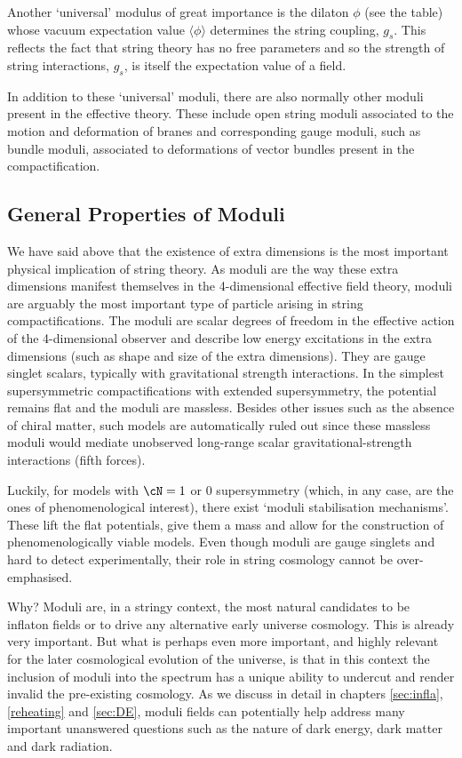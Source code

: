 Another `universal' modulus of great importance is the dilaton $\phi$ (see the table) whose vacuum expectation value $\langle \phi \rangle $ determines the  string coupling, $g_s$. This reflects the fact that string theory has no free parameters and so the strength of string interactions, $g_s$, is itself the expectation value of a field.

In addition to these `universal' moduli, there are also normally other moduli present in the effective theory. These include open string moduli associated to the motion and deformation of branes and corresponding gauge moduli, such as bundle moduli, associated to deformations of vector bundles present in the compactification.

\subsection{General Properties of Moduli}
   
We have said above that the existence of extra dimensions is the most important physical implication of string theory. As moduli are the way these extra dimensions manifest themselves in the 4-dimensional effective field theory, 
moduli are arguably the most important type of particle arising in string compactifications. The 
moduli are scalar degrees of freedom in the effective action of the 4-dimensional observer and describe low energy
excitations in the extra dimensions (such as shape and size of the extra dimensions). They are 
gauge singlet scalars, typically with gravitational strength interactions. In the simplest supersymmetric compactifications with extended supersymmetry, the potential remains flat and the moduli are massless. Besides other issues such as the 
absence of chiral matter, such models are automatically ruled out since these massless moduli would mediate unobserved long-range scalar gravitational-strength interactions (fifth forces).

 Luckily, for models with $\cN= 1$ or $0$ supersymmetry (which, in any case, are the ones of phenomenological interest), there
exist `moduli stabilisation mechanisms'. These lift the flat potentials, give them a mass and allow for the construction of phenomenologically
viable models. Even though moduli are gauge singlets and hard to detect experimentally, their role in string cosmology cannot be over-emphasised. 

Why? Moduli are, in a stringy context, the most natural candidates to be inflaton fields or to drive any alternative early universe cosmology. This is already very important. But what is perhaps even more important, and highly relevant for the later cosmological evolution of the universe, is that in this context the inclusion of moduli into the spectrum has a unique ability to undercut and render invalid the pre-existing cosmology. As we discuss in detail
in chapters \ref{sec:infla}, \ref{reheating} and \ref{sec:DE}, moduli fields can potentially help address many important unanswered questions such as the nature of dark energy, dark matter and dark radiation. 

